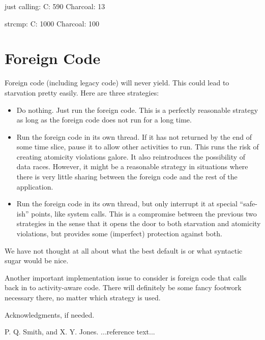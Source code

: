 \documentclass[10pt,preprint]{sigplanconf}
\begin{document}
just calling: C: 590  Charcoal: 13

strcmp: C: 1000 Charcoal: 100



\section{Foreign Code}

Foreign code (including legacy code) will never yield.  This could lead
to starvation pretty easily.  Here are three strategies:

\begin{itemize}
\item Do nothing.
  Just run the foreign code.
  This is a perfectly reasonable strategy as long as the foreign code does not run for a long time.
\item Run the foreign code in its own thread.
  If it has not returned by the end of some time slice, pause it to allow other activities to run.
  This runs the risk of creating atomicity violations galore.
  It also reintroduces the possibility of data races.
  However, it might be a reasonable strategy in situations where there is very little sharing between the foreign code and the rest of the application.
\item Run the foreign code in its own thread, but only interrupt it at special ``safe-ish'' points, like system calls.
  This is a compromise between the previous two strategies in the sense that it opens the door to both starvation and atomicity violations, but provides some (imperfect) protection against both.
\end{itemize}

We have not thought at all about what the best default is or what syntactic sugar would be nice.

Another important implementation issue to consider is foreign code that calls back in to activity-aware code.
There will definitely be some fancy footwork necessary there, no matter which strategy is used.

\acks

Acknowledgments, if needed.





\begin{thebibliography}{}
\softraggedright

P. Q. Smith, and X. Y. Jones. ...reference text...

\end{thebibliography}
\end{document}
